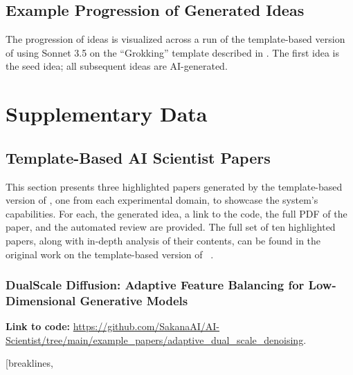 \begin{appendices}
\subsection{Example Progression of Generated Ideas}
\label{app:idea_progression}

The progression of ideas is visualized across a run of the template-based version of \ouralgo using Sonnet 3.5 on the ``Grokking'' template described in  .
The first idea is the seed idea; all subsequent ideas are AI-generated.



\clearpage

\section{Supplementary Data}
\label{app:data}

\subsection{Template-Based AI Scientist Papers}
\label{appsec:template_based_papers}
This section presents three highlighted papers generated by the template-based version of \ouralgo, one from each experimental domain, to showcase the system's capabilities. For each, the generated idea, a link to the code, the full PDF of the paper, and the automated review are provided. The full set of ten highlighted papers, along with in-depth analysis of their contents, can be found in the original work on the template-based version of \ouralgo~\citep{lu2024ai}.

\subsubsection{DualScale Diffusion: Adaptive Feature Balancing for Low-Dimensional Generative Models}
\begin{tcolorbox}[
  breakable,
  colback  = blue!5!white,
  colframe = blue!75!black,
  title    = {Idea},
  fontupper=\scriptsize\ttfamily,
]
\end{tcolorbox}
\textbf{Link to code:} \url{https://github.com/SakanaAI/AI-Scientist/tree/main/example_papers/adaptive_dual_scale_denoising}.

\label{paper:adaptive_dual_scale_denoising}
\begin{tcolorbox}[
  breakable,
  colback  = green!5!white,
  colframe = green!75!black,
  title    = {Review},
  fontupper=\scriptsize\ttfamily,
]
\VerbatimInput[breaklines,


\end{tcolorbox}
\end{appendices}
